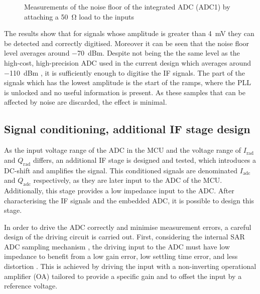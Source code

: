 \begin{figure}[htb]
	\centering
	\caption{Measurements of the noise floor of the integrated ADC (ADC1) by attaching a \SI{50}{\ohm} load to the inputs \label{fig:adc_nf}}
\end{figure}

The results show that for signals whose amplitude is greater than \SI{4}{\milli\volt} they can be detected and correctly digitised. Moreover it can be seen that the noise floor level averages around \SI{-70}{dBm}. Despite not being the the same level as the high-cost, high-precision ADC used in the current design which averages around \SI{-110}{dBm} \cite{ADLINKTechnologies2010}, it is sufficiently enough to digitise the IF signals. The part of the signals which has the lowest amplitude is the start of the ramps, where the PLL is unlocked and no useful information is present. As these samples that can be affected by noise are discarded, the effect is minimal.

\subsection{Signal conditioning, additional IF stage design}

As the input voltage range of the ADC in the MCU and the voltage range of $I_\mathrm{rad}$ and $Q_\mathrm{rad}$ differs, an additional IF stage is designed and tested, which introduces a DC-shift and amplifies the signal. This conditioned signals are denominated $I_\mathrm{adc}$ and $Q_\mathrm{adc}$ respectively, as they are later input to the ADC of the MCU. Additionally, this stage provides a low impedance input to the ADC. After characterising the IF signals and the embedded ADC, it is possible to design this stage. 

In order to drive the ADC correctly and minimise measurement errors, a careful design of the driving circuit is carried out. First, considering the internal SAR ADC sampling mechanism \cite[pp.~356,~363]{STMicroelectronics2022a}, the driving input to the ADC must have low impedance to benefit from a low gain error, low settling time error, and less distortion \cite{Franco2014}. This is achieved by driving the input with a non-inverting operational amplifier (OA) tailored to provide a specific gain and to offset the input by a reference voltage.

